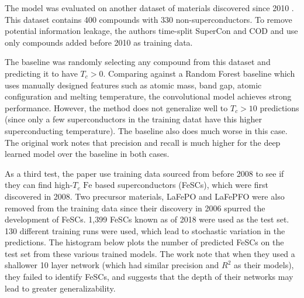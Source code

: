 \documentclass[book.tex]{subfiles}
\begin{document}
The model was evaluated on another dataset of materials discovered since 2010 . This dataset contains 400 compounds with 330 non-superconductors. To remove potential information leakage, the authors time-split SuperCon and COD and use only compounds added before 2010 as training data.%



The baseline was randomly selecting any compound from this dataset and predicting it to have $T_c > 0$. Comparing against a Random Forest baseline which uses manually designed features such as atomic mass, band gap, atomic configuration and melting temperature, the convolutional model achieves strong performance. However, the method does not generalize well to $T_c > 10$ predictions (since only a few superconductors in the training datat have this higher superconducting temperature). The baseline also does much worse in this case. The original work notes that precision and recall is much higher for the deep learned model over the baseline in both cases. %


As a third test, the paper use training data sourced from before 2008 to see if they can find high-$T_c$ $\textrm{Fe}$ based superconductors (FeSCs), which were first discovered in 2008. Two precursor materials, LaFePO and LaFePFO were also removed from the training data since their discovery in 2006 spurred the development of FeSCs. 1,399 FeSCs known as of 2018 were used as the test set. 130 different training runs were used, which lead to stochastic variation in the predictions. The histogram below plots the number of predicted FeSCs on the test set from these various trained models. The work note that when they used a shallower 10 layer network (which had similar precision and $R^2$ as their models), they failed to identify FeSCs, and suggests that the depth of their networks may lead to greater generalizability.
\end{document}
